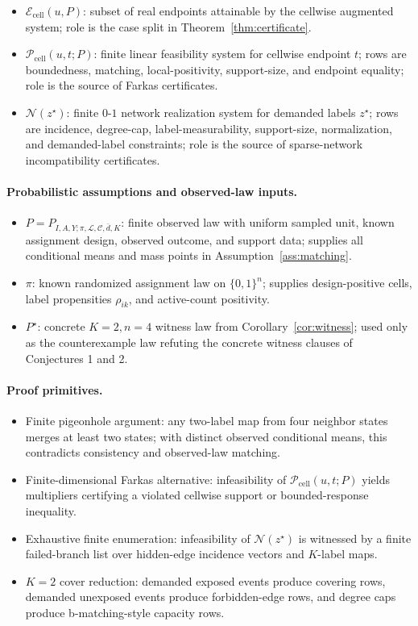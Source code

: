 \documentclass[11pt]{article}
\theoremstyle{definition}
\theoremstyle{plain}
\theoremstyle{remark}
\begin{document}
\begin{itemize}[leftmargin=*]
  \item \(\mathcal E_{\mathrm{cell}}(u,P)\): subset of real endpoints attainable by the cellwise augmented system; role is the case split in Theorem~\ref{thm:certificate}.
  \item \(\mathcal P_{\mathrm{cell}}(u,t;P)\): finite linear feasibility system for cellwise endpoint \(t\); rows are boundedness, matching, local-positivity, support-size, and endpoint equality; role is the source of Farkas certificates.
  \item \(\mathcal N(z^\star)\): finite \(0\)-\(1\) network realization system for demanded labels \(z^\star\); rows are incidence, degree-cap, label-measurability, support-size, normalization, and demanded-label constraints; role is the source of sparse-network incompatibility certificates.
\end{itemize}

\paragraph{Probabilistic assumptions and observed-law inputs.}
\begin{itemize}[leftmargin=*]
  \item \(P=P_{I,A,Y;\pi,\mathcal L,\mathcal C,\bar d,K}\): finite observed law with uniform sampled unit, known assignment design, observed outcome, and support data; supplies all conditional means and mass points in Assumption~\ref{ass:matching}.
  \item \(\pi\): known randomized assignment law on \(\{0,1\}^n\); supplies design-positive cells, label propensities \(\rho_{ik}\), and active-count positivity.
  \item \(P^\star\): concrete \(K=2,n=4\) witness law from Corollary~\ref{cor:witness}; used only as the counterexample law refuting the concrete witness clauses of Conjectures 1 and 2.
\end{itemize}

\paragraph{Proof primitives.}
\begin{itemize}[leftmargin=*]
  \item Finite pigeonhole argument: any two-label map from four neighbor states merges at least two states; with distinct observed conditional means, this contradicts consistency and observed-law matching.
  \item Finite-dimensional Farkas alternative: infeasibility of \(\mathcal P_{\mathrm{cell}}(u,t;P)\) yields multipliers certifying a violated cellwise support or bounded-response inequality.
  \item Exhaustive finite enumeration: infeasibility of \(\mathcal N(z^\star)\) is witnessed by a finite failed-branch list over hidden-edge incidence vectors and \(K\)-label maps.
  \item \(K=2\) cover reduction: demanded exposed events produce covering rows, demanded unexposed events produce forbidden-edge rows, and degree caps produce b-matching-style capacity rows.
\end{itemize}
\end{document}
